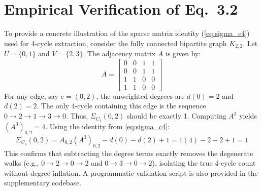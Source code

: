 \documentclass{siuro250211}
\theoremstyle{remark}
\theoremstyle{plain}
\begin{document}
\appendix
\section{Empirical Verification of Eq.~3.2}
To provide a concrete illustration of the sparse matrix identity (\cref{eq:sigma_c4}) used for 4-cycle extraction, consider the fully connected bipartite graph $K_{2,2}$. Let $U = \{0, 1\}$ and $V = \{2, 3\}$. The adjacency matrix $A$ is given by:
\begin{equation}
A = \begin{bmatrix} 0 & 0 & 1 & 1 \\ 0 & 0 & 1 & 1 \\ 1 & 1 & 0 & 0 \\ 1 & 1 & 0 & 0 \end{bmatrix}
\end{equation}
For any edge, say $e=(0,2)$, the unweighted degrees are $d(0)=2$ and $d(2)=2$. The only 4-cycle containing this edge is the sequence $0 \to 2 \to 1 \to 3 \to 0$. Thus, $\Sigma_{C_4}(0,2)$ should be exactly 1. Computing $A^3$ yields $(A^3)_{0,2} = 4$. Using the identity from \cref{eq:sigma_c4}:
\begin{equation}
\Sigma_{C_4}(0,2) = A_{0,2} (A^3)_{0,2} - d(0) - d(2) + 1 = 1(4) - 2 - 2 + 1 = 1
\end{equation}
This confirms that subtracting the degree terms exactly removes the degenerate walks (e.g., $0 \to 2 \to 0 \to 2$ and $0 \to 3 \to 0 \to 2$), isolating the true 4-cycle count without degree-inflation. A programmatic validation script is also provided in the supplementary codebase.



\end{document}
